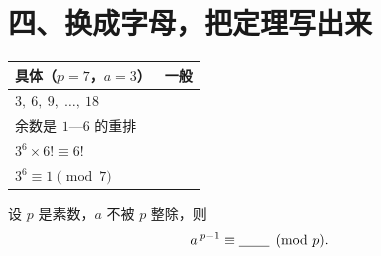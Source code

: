 \documentclass[11pt]{ctexart}
\begin{document}
\section*{四、换成字母，把定理写出来}

\begin{center}
{\small
\begin{tabular}{@{}ll@{}}
  \toprule
  \textbf{具体}（\(p=7\)，\(a=3\)） & \textbf{一般} \\
  \midrule
  \(3,\ 6,\ 9,\ \dots,\ 18\) & \underline{\hspace{5.6em}} \\
  余数是 \(1\text{—}6\) 的重排 & \underline{\hspace{5.6em}} \\
  \(3^{6}\times6!\equiv6!\) & \underline{\hspace{5.6em}} \\
  \(3^{6}\equiv1\pmod 7\) & \underline{\hspace{5.6em}} \\
  \bottomrule
\end{tabular}}
\end{center}

\vspace{0.3em}
设 \(p\) 是素数，\(a\) 不被 \(p\) 整除，则
\[
  a^{\,p-1}\equiv\underline{\hspace{2.2em}} \pmod p .
\]
\end{document}
